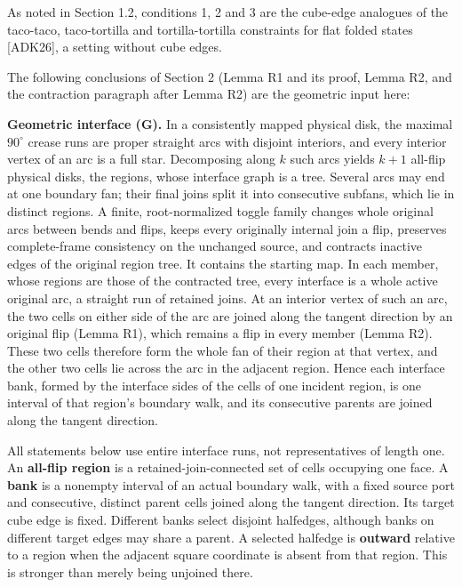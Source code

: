 \documentclass[
  11pt,
]{article}
\newcounter{none} %
\begin{document}
As noted in Section 1.2, conditions 1, 2 and 3 are the cube-edge
analogues of the taco-taco, taco-tortilla and tortilla-tortilla
constraints for flat folded states {[}ADK26{]}, a setting without cube
edges.

The following conclusions of Section 2 (Lemma R1 and its proof, Lemma
R2, and the contraction paragraph after Lemma R2) are the geometric
input here:

\textbf{Geometric interface (G).} In a consistently mapped physical
disk, the maximal \(90^\circ\) crease runs are proper straight arcs with
disjoint interiors, and every interior vertex of an arc is a full star.
Decomposing along \(k\) such arcs yields \(k+1\) all-flip physical
disks, the regions, whose interface graph is a tree. Several arcs may
end at one boundary fan; their final joins split it into consecutive
subfans, which lie in distinct regions. A finite, root-normalized toggle
family changes whole original arcs between bends and flips, keeps every
originally internal join a flip, preserves complete-frame consistency on
the unchanged source, and contracts inactive edges of the original
region tree. It contains the starting map. In each member, whose regions
are those of the contracted tree, every interface is a whole active
original arc, a straight run of retained joins. At an interior vertex of
such an arc, the two cells on either side of the arc are joined along
the tangent direction by an original flip (Lemma R1), which remains a
flip in every member (Lemma R2). These two cells therefore form the
whole fan of their region at that vertex, and the other two cells lie
across the arc in the adjacent region. Hence each interface bank, formed
by the interface sides of the cells of one incident region, is one
interval of that region's boundary walk, and its consecutive parents are
joined along the tangent direction.

All statements below use entire interface runs, not representatives of
length one. An \textbf{all-flip region} is a retained-join-connected set
of cells occupying one face. A \textbf{bank} is a nonempty interval of
an actual boundary walk, with a fixed source port and consecutive,
distinct parent cells joined along the tangent direction. Its target
cube edge is fixed. Different banks select disjoint halfedges, although
banks on different target edges may share a parent. A selected halfedge
is \textbf{outward} relative to a region when the adjacent square
coordinate is absent from that region. This is stronger than merely
being unjoined there.
\end{document}
